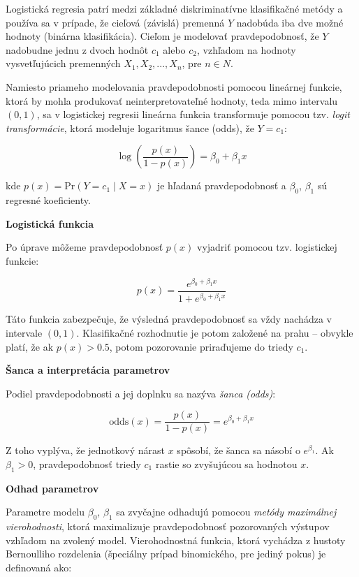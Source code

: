 Logistická regresia patrí medzi základné diskriminatívne klasifikačné metódy a používa sa v prípade, že cieľová (závislá) premenná $Y$ nadobúda iba dve možné hodnoty (binárna klasifikácia). Cieľom je modelovať pravdepodobnosť, že $Y$ nadobudne jednu z dvoch hodnôt $c_1$ alebo $c_2$, vzhľadom na hodnoty vysvetľujúcich premenných $X_1, X_2, ..., X_n$, pre $n \in N$.

Namiesto priameho modelovania pravdepodobnosti pomocou lineárnej funkcie, ktorá by mohla produkovať neinterpretovateľné hodnoty, teda mimo intervalu $(0,1)$, sa v logistickej regresii lineárna funkcia transformuje pomocou tzv. \textit{logit transformácie}, ktorá modeluje logaritmus šance (odds), že $Y = c_1$:

\begin{equation}
\log\left( \frac{p(x)}{1 - p(x)} \right) = \beta_0 + \beta_1 x
\end{equation}

kde $p(x) = \mathrm{Pr}(Y=c_1\mid X=x)$ je hľadaná pravdepodobnosť a $\beta_0$, $\beta_1$ sú regresné koeficienty.

\textbf{Logistická funkcia}

Po úprave môžeme pravdepodobnosť $p(x)$ vyjadriť pomocou tzv. logistickej funkcie:

\begin{equation}
p(x) = \frac{e^{\beta_0 + \beta_1 x}}{1 + e^{\beta_0 + \beta_1 x}}
\end{equation}

Táto funkcia zabezpečuje, že výsledná pravdepodobnosť sa vždy nachádza v intervale $(0,1)$. Klasifikačné rozhodnutie je potom založené na prahu – obvykle platí, že ak $p(x) > 0.5$, potom pozorovanie priraďujeme do triedy $c_1$.

\textbf{Šanca a interpretácia parametrov}

Podiel pravdepodobnosti a jej doplnku sa nazýva \textit{šanca (odds)}:

\begin{equation}
\text{odds}(x) = \frac{p(x)}{1 - p(x)} = e^{\beta_0 + \beta_1 x}
\end{equation}

Z toho vyplýva, že jednotkový nárast $x$ spôsobí, že šanca sa násobí o $e^{\beta_1}$. Ak $\beta_1 > 0$, pravdepodobnosť triedy $c_1$ rastie so zvyšujúcou sa hodnotou $x$.

\textbf{Odhad parametrov}

Parametre modelu $\beta_0$, $\beta_1$ sa zvyčajne odhadujú pomocou \textit{metódy maximálnej vierohodnosti}, ktorá maximalizuje pravdepodobnosť pozorovaných výstupov vzhľadom na zvolený model. Vierohodnostná funkcia, ktorá vychádza z hustoty Bernoulliho rozdelenia (špeciálny prípad binomického, pre jediný pokus) je definovaná ako:

